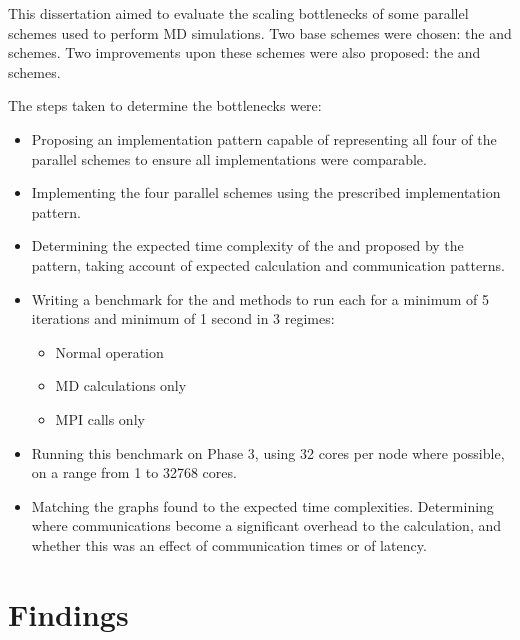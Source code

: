 %
This dissertation aimed to evaluate the scaling bottlenecks of
some parallel schemes used to perform \twobody{} MD simulations.
%
Two base schemes were chosen:
the \replicateddata{} and \systolicloop{} schemes.
Two improvements upon these schemes were also proposed:
the \sharedandreplicateddata{} and \replicatedsystolicloop{} schemes.

The steps taken to determine the bottlenecks were:
\begin{itemize}
\item
    Proposing an implementation pattern capable of representing
    all four of the parallel schemes to ensure all implementations
    were comparable.

\item
    Implementing the four parallel schemes using the prescribed
    implementation pattern.

\item
    Determining the expected time complexity of the
    \individualoperation{} and \pairoperation{} proposed by
    the pattern, taking
    account of expected calculation and communication patterns.

\item
    Writing a benchmark for the
    \individualoperation{} and \pairoperation{} methods
    to run each for a minimum of 5 iterations and minimum of 1 second
    in 3 regimes:
    \begin{itemize}
        \item Normal operation
        \item MD calculations only
        \item MPI calls only
    \end{itemize}

\item
    Running this benchmark on \hector{} Phase 3, using 32 cores per node
    where possible, on a range from 1 to 32768 cores.

\item
    Matching the graphs found to the expected time complexities.
    Determining where communications become a significant overhead
    to the calculation, and whether this was an effect of communication
    times or of latency.
\end{itemize}


\section{Findings}

